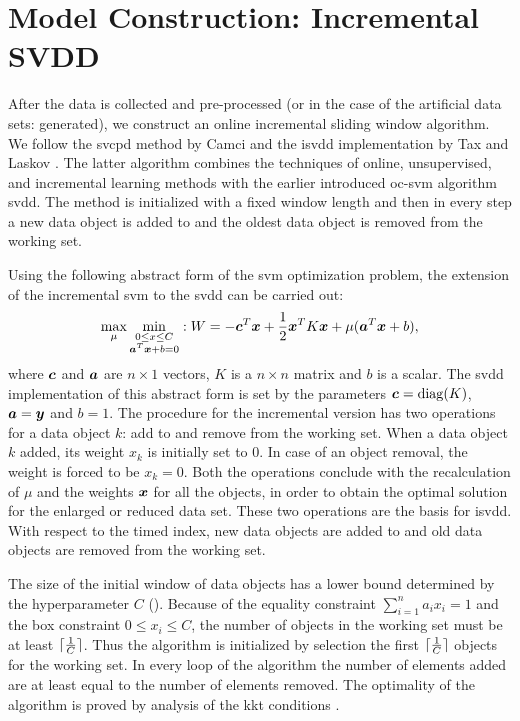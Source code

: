 \section{Model Construction: Incremental SVDD}\label{sec:method_model_construction}
After the data is collected and pre-processed (or in the case of the artificial data sets: generated), we construct an online incremental sliding window algorithm.
We follow the \gls{svcpd} method by Camci \cite{camci2010change} and the \gls{isvdd} implementation by Tax and Laskov \cite{tax2003online}.
The latter algorithm combines the techniques of online, unsupervised, and incremental learning methods with the earlier introduced \gls{oc-svm} algorithm \gls{svdd}.
The method is initialized with a fixed window length and then in every step a new data object is added to and the oldest data object is removed from the working set.

Using the following abstract form of the \gls{svm} optimization problem, the extension of the incremental \gls{svm} to the \gls{svdd} can be carried out:
\begin{equation}
  \operatorname*{max}_\mu \operatorname*{min}_{\substack{
    0 \le x \le C \\
    \vectorsym{a}^T \vectorsym{x} + b = 0}
  } : W = -\vectorsym{c}^T\vectorsym{x} + \frac{1}{2}\vectorsym{x}^T K\vectorsym{x} + \mu(\vectorsym{a}^T\vectorsym{x} + b),
\end{equation}
where $\vectorsym{c}$ and $\vectorsym{a}$ are $n \times 1$ vectors, $K$ is a $n \times n$ matrix and $b$ is a scalar.
The \gls{svdd} implementation of this abstract form is set by the parameters $\vectorsym{c}=\operatorname*{diag}(K)$, $\vectorsym{a} = \vectorsym{y}$ and $b=1$.
The procedure for the incremental version has two operations for a data object $k$: add to and remove from the working set.
When a data object $k$ added, its weight $x_k$ is initially set to $0$.
In case of an object removal, the weight is forced to be $x_k=0$.
Both the operations conclude with the recalculation  of $\mu$ and the weights $\vectorsym{x}$ for all the objects, in order to obtain the optimal solution for the enlarged or reduced data set.
These two operations are the basis for \gls{isvdd}.
With respect to the timed index, new data objects are added to and old data objects are removed from the working set.

The size of the initial window of data objects has a lower bound determined by the hyperparameter $C$ ().
Because of the equality constraint $\sum_{i=1}^n a_i x_i = 1$ and the box constraint $0 \le x_i \le C$, the number of objects in the working set must be at least $\lceil\frac{1}{C}\rceil$.
Thus the algorithm is initialized by selection the first $\lceil\frac{1}{C}\rceil$ objects for the working set.
In every loop of the algorithm the number of elements added are at least equal to the number of elements removed.
The optimality of the algorithm is proved by analysis of the \gls{kkt} conditions \cite{tax2003online}.

